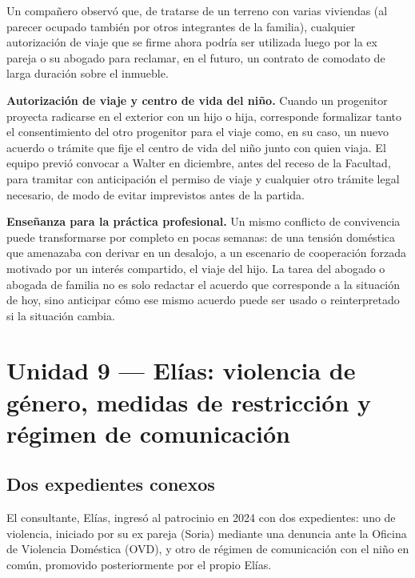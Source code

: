 \documentclass[12pt,oneside]{book}
\begin{document}
Un compañero observó que, de tratarse de un terreno con varias viviendas (al parecer ocupado también por otros integrantes de la familia), cualquier autorización de viaje que se firme ahora podría ser utilizada luego por la ex pareja o su abogado para reclamar, en el futuro, un contrato de comodato de larga duración sobre el inmueble.

\begin{important}
\textbf{Autorización de viaje y centro de vida del niño.} Cuando un progenitor proyecta radicarse en el exterior con un hijo o hija, corresponde formalizar tanto el consentimiento del otro progenitor para el viaje como, en su caso, un nuevo acuerdo o trámite que fije el centro de vida del niño junto con quien viaja. El equipo previó convocar a Walter en diciembre, antes del receso de la Facultad, para tramitar con anticipación el permiso de viaje y cualquier otro trámite legal necesario, de modo de evitar imprevistos antes de la partida.
\end{important}

\begin{note}
\textbf{Enseñanza para la práctica profesional.} Un mismo conflicto de convivencia puede transformarse por completo en pocas semanas: de una tensión doméstica que amenazaba con derivar en un desalojo, a un escenario de cooperación forzada motivado por un interés compartido, el viaje del hijo. La tarea del abogado o abogada de familia no es solo redactar el acuerdo que corresponde a la situación de hoy, sino anticipar cómo ese mismo acuerdo puede ser usado o reinterpretado si la situación cambia.
\end{note}

\section{Unidad 9 --- Elías: violencia de género, medidas de restricción y régimen de comunicación}

\subsection{Dos expedientes conexos}

El consultante, Elías, ingresó al patrocinio en 2024 con dos expedientes: uno de violencia, iniciado por su ex pareja (Soria) mediante una denuncia ante la Oficina de Violencia Doméstica (OVD), y otro de régimen de comunicación con el niño en común, promovido posteriormente por el propio Elías.
\end{document}
